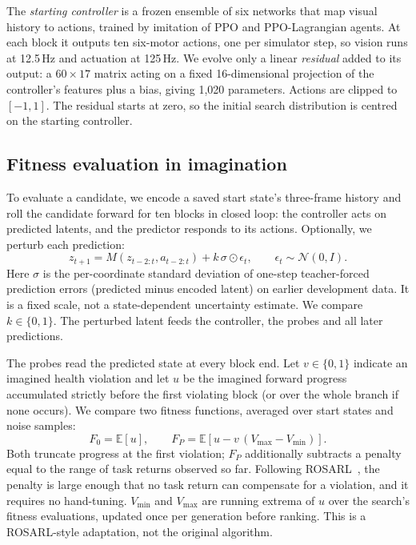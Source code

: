 \documentclass[sigconf,dvipsnames]{acmart}
\newcommand{\rosarl}{ROSARL}
\begin{document}
The \emph{starting controller} is a frozen ensemble of six networks that map
visual history to actions, trained by imitation of PPO and PPO-Lagrangian
agents. At each block it outputs ten six-motor actions, one per simulator step,
so vision runs at 12.5\,Hz and actuation at 125\,Hz. We evolve only a linear
\emph{residual} added to its output: a $60\times17$ matrix acting on a fixed
16-dimensional projection of the controller's features plus a bias, giving
1,020 parameters. Actions are clipped to $[-1,1]$. The residual starts at zero,
so the initial search distribution is centred on the starting controller.

\subsection{Fitness evaluation in imagination}

To evaluate a candidate, we encode a saved start state's three-frame history
and roll the candidate forward for ten blocks in closed loop: the controller
acts on predicted latents, and the predictor responds to its actions.
Optionally, we perturb each prediction:
\begin{equation}
 z_{t+1}=M(z_{t-2:t},a_{t-2:t})+k\,\sigma\odot\epsilon_t,
 \qquad \epsilon_t\sim\mathcal{N}(0,I).
\label{eq:noise}
\end{equation}
Here $\sigma$ is the per-coordinate standard deviation of one-step
teacher-forced prediction errors (predicted minus encoded latent) on earlier
development data. It is a fixed scale, not a state-dependent uncertainty
estimate. We compare $k\in\{0,1\}$. The perturbed latent feeds the controller,
the probes and all later predictions.

The probes read the predicted state at every block end. Let $v\in\{0,1\}$
indicate an imagined health violation and let $u$ be the imagined forward
progress accumulated strictly before the first violating block (or over the
whole branch if none occurs). We compare two fitness functions, averaged over
start states and noise samples:
\begin{equation}
 F_0=\mathbb{E}[u], \qquad
 F_P=\mathbb{E}\left[u-v\,(V_{\max}-V_{\min})\right].
\label{eq:score}
\end{equation}
Both truncate progress at the first violation; $F_P$ additionally subtracts a
penalty equal to the range of task returns observed so far. Following
\rosarl{}~\cite{tasse2026simple}, the penalty is large enough that no task
return can compensate for a violation, and it requires no hand-tuning.
$V_{\min}$ and $V_{\max}$ are running extrema of $u$ over the search's fitness
evaluations, updated once per generation before ranking. This is a
\rosarl{}-style adaptation, not the original algorithm.
\end{document}
